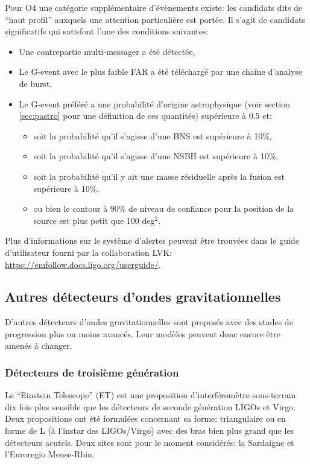 Pour O4 une catégorie supplémentaire d'évènements existe: les candidats dits de ``haut profil'' auxquels une attention particulière est portée.
Il s'agit de candidats significatifs qui satisfont l'une des conditions suivantes:
\begin{itemize}
\item Une contrepartie multi-messager a été détectée,
\item Le G-event avec le plus faible FAR a été téléchargé par une chaîne d'analyse de burst,
\item Le G-event préféré a une probabilité d'origine astrophysique (voir section \ref{sec:pastro} pour une définition de ces quantités) supérieure à 0.5 et:
  \begin{itemize}
  \item soit la probabilité qu'il s'agisse d'une BNS est supérieure à 10\%,
  \item soit la probabilité qu'il s'agisse d'une NSBH est supérieure à 10\%,
  \item soit la probabilité qu'il y ait une masse résiduelle après la fusion est supérieure à 10\%,
  \item ou bien le contour à 90\% de niveau de confiance pour la position de la source est plus petit que 100 deg$^2$.
  \end{itemize}
\end{itemize}

Plus d'informations sur le système d'alertes peuvent être trouvées dans le guide d'utilisateur fourni par la collaboration LVK: \url{https://emfollow.docs.ligo.org/userguide/}.

\clearpage\newpage
\subsection{Autres détecteurs d'ondes gravitationnelles}

D'autres détecteurs d'ondes gravitationnelles sont proposés avec des stades de progression plus ou moins avancés.
Leur modèles peuvent donc encore être amenés à changer.

\subsubsection*{Détecteurs de troisième génération}

Le ``Einstein Telescope'' (ET) \cite{ET} est une proposition d'interféromètre sous-terrain dix fois plus sensible que les détecteurs de seconde génération LIGOs et Virgo.
Deux propositions ont été formulées concernant sa forme: triangulaire ou en forme de L (à l'instar des LIGOs/Virgo) avec des bras bien plus grand que les détecteurs acutels.
Deux sites sont pour le moment considérés: la Sardaigne et l'Euroregio Meuse-Rhin.

